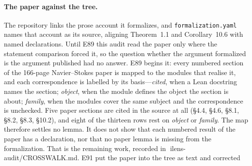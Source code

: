 \documentclass[11pt]{article}
\newcommand{\file}[1]{\texttt{\small #1}}
\theoremstyle{plain}
\theoremstyle{definition}
\theoremstyle{remark}
\begin{document}
\paragraph{The paper against the tree.} The repository links the prose account
it formalizes, and \file{formalization.yaml} names that account as its source,
aligning Theorem~1.1 and Corollary~10.6 with named declarations. Until E89 this
audit read the paper only where the statement comparison forced it, so the
question whether the argument formalized is the argument published had no
answer. E89 begins it: every numbered section of the 166-page Navier--Stokes
paper is mapped to the modules that realise it, and each correspondence is
labelled by its basis---\emph{cited}, when a Lean docstring names the section;
\emph{object}, when the module defines the object the section is about;
\emph{family}, when the modules cover the same subject and the correspondence is
unchecked. Five paper sections are cited in the source at all (\S4.4, \S4.6,
\S8.1, \S8.2, \S8.3, \S10.2), and eight of the thirteen rows rest on
\emph{object} or \emph{family}. The map therefore settles no lemma. It does not
show that each numbered result of the paper has a declaration, nor that no paper
lemma is missing from the formalization. That is the remaining work, recorded in
ile{ns-audit/CROSSWALK.md}. E91 put the paper into the tree as text and corrected
\end{document}
